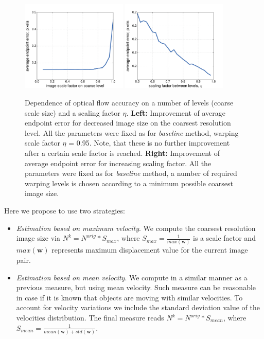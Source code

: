 \begin{figure}[ht]
  \centerline{
    \mbox{\includegraphics[width=0.45\textwidth]{figures/opt_warping_levels.pdf}}
    \mbox{\includegraphics[width=0.45\textwidth]{figures/exp_optimize_scaling_factor.pdf}}
  }  
  \caption{Dependence of optical flow accuracy on a number of levels (coarse scale size) and a scaling factor $\eta$. \textbf{Left:} Improvement of average endpoint error for decreased image size on the coarsest resolution level. All the parameters were fixed as for \textit{baseline} method, warping scale factor $\eta$ = 0.95. Note, that these is no further improvement after a certain scale factor is reached. \textbf{Right:} Improvement of average endpoint error for increasing scaling factor. All the parameters were fixed as for \textit{baseline} method, a number of required warping levels is chosen according to a minimum possible coarsest image size.}
  \label{fig:opt_warping_levels}
\end{figure}

Here we propose to use two strategies:

\begin{itemize}
	\item \textit{Estimation based on maximum velocity}. We compute the coarsest resolution image size via $ N^k = N^{orig}*S_{max}$, where $S_{max}=\frac{1}{max(\textbf{w})}$ is a scale factor and $max(\textbf{w})$ represents maximum displacement value for the current image pair.
	\item \textit{Estimation based on mean velocity}. We compute in a similar manner as a previous measure, but using mean velocity. Such measure can be reasonable in case if it is known that objects are moving with similar velocities. To account for velocity variations we include the standard deviation value of the velocities distribution. The final measure reads  $ N^k = N^{orig}*S_{mean}$, where $S_{mean}=\frac{1}{mean(\textbf{w}) + std(\textbf{w})}$. 
\end{itemize}

